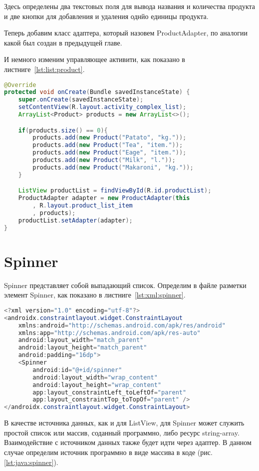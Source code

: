 Здесь определены два текстовых поля для вывода названия и количества
продукта и две кнопки для добавления и удаления однйо единицы продукта.\par
Теперь добавим класс адаптера, который назовем ProductAdapter, по аналогии
какой был создан в предыдущей главе.\par
И немного изменим управляющее активити, как показано
в листниге~\ref{lst:list:product}.

\begin{lstlisting}[language=Java
	, label=lst:list:product
	]
@Override
protected void onCreate(Bundle savedInstanceState) {
	super.onCreate(savedInstanceState);
	setContentView(R.layout.activity_complex_list);
	ArrayList<Product> products = new ArrayList<>();

	if(products.size() == 0){
		products.add(new Product("Patato", "kg."));
		products.add(new Product("Tea", "item."));
		products.add(new Product("Eage", "item."));
		products.add(new Product("Milk", "l."));
		products.add(new Product("Makaroni", "kg."));
	}

	ListView productList = findViewById(R.id.productList);
	ProductAdapter adapter = new ProductAdapter(this
		, R.layout.product_list_item
		, products);
	productList.setAdapter(adapter);
}
\end{lstlisting}

\section{Spinner}
Spinner представляет собой выпадающий список. Определим в файле
разметки элемент Spinner, как показано
в листниге~\ref{lst:xml:spinner}.

\begin{lstlisting}[language=Java
	, label=lst:xml:spinner
	]
<?xml version="1.0" encoding="utf-8"?>
<androidx.constraintlayout.widget.ConstraintLayout
	xmlns:android="http://schemas.android.com/apk/res/android"
	xmlns:app="http://schemas.android.com/apk/res-auto"
	android:layout_width="match_parent"
	android:layout_height="match_parent"
	android:padding="16dp">
	<Spinner
		android:id="@+id/spinner"
		android:layout_width="wrap_content"
		android:layout_height="wrap_content"
		app:layout_constraintLeft_toLeftOf="parent"
		app:layout_constraintTop_toTopOf="parent" />
</androidx.constraintlayout.widget.ConstraintLayout>
\end{lstlisting}

В качестве источника данных, как и для ListView, для Spinner может служить
простой список или массив, соданный программно, либо ресурс string-array.
Взаимодействие с источником данных также будет идти через адаптер. В
данном случае определим источник программно в виде массива в коде
(рис. \ref{lst:java:spinner}).

